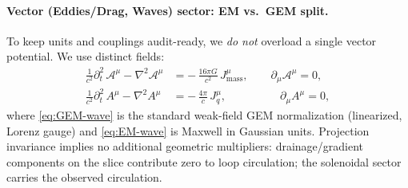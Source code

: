 \paragraph{Vector (Eddies/Drag, Waves) sector: EM vs.\ GEM split.}
To keep units and couplings audit-ready, we \emph{do not} overload a single vector potential. We use distinct fields:
\begin{align}
\label{eq:GEM-wave}
\frac{1}{c^{2}}\partial_t^{2}\,\mathcal{A}^{\mu}-\nabla^{2}\mathcal{A}^{\mu}&= -\,\frac{16\pi G}{c^{2}}\,J_{\text{mass}}^{\mu}, \qquad \partial_{\mu}\mathcal{A}^{\mu}=0,\\[4pt]
\label{eq:EM-wave}
\frac{1}{c^{2}}\partial_t^{2}\,A^{\mu}-\nabla^{2}A^{\mu}&= -\,\frac{4\pi}{c}\,J_{q}^{\mu}, \qquad\;\;\;\;\;\;\;\;\;\; \partial_{\mu}A^{\mu}=0,
\end{align}
where \eqref{eq:GEM-wave} is the standard weak-field GEM normalization (linearized, Lorenz gauge) and \eqref{eq:EM-wave} is Maxwell in Gaussian units. Projection invariance implies no additional geometric multipliers: drainage/gradient components on the slice contribute zero to loop circulation; the solenoidal sector carries the observed circulation.

\medskip


